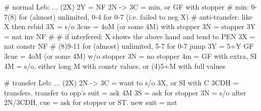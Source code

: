 # normal Leb: ... (2X)
2Y = NF
2N -> 3C = min, or GF with stopper  # min: 0-7(8) for (almost) unlimited, 0-4 for 0-7 (i.e. failed to neg X)
    # anti-transfer: like X then rebid
    3X = s/o
    3cue = 4oM (or some 4M) with stopper
    3N = stopper
    3Y = nat inv NF  # 
    # if interfered: X shows the above hand and tend to PEN
3X = nat constr NF  # (8)9-11 for (almost) unlimited, 5-7 for 0-7
jump 3Y = 5+Y GF
3cue = 4oM (or some 4M) w/o stopper
3N = no stopper
4m = GF with extra, SI
4M = s/o. either long M with constr values, or (4)5+M with full values

# transfer Leb: ... (2X)
2N -> 3C = want to s/o 3X, or SI with C
3CDH = transfers. transfer to opp's suit = ask 4M
3S = ask for stopper
3N = s/o
after 2N/3CDH, cue = ask for stopper or ST. new suit = nat